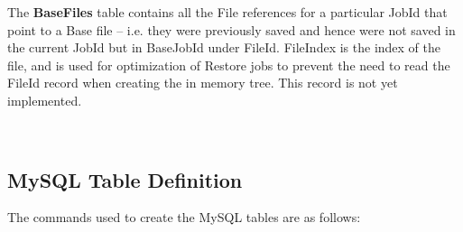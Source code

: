 {{{\begin{longtable}{|l|l|l|}
\end{longtable}

The {\bf BaseFiles} table contains all the File references for a particular
JobId that point to a Base file -- i.e. they were previously saved and hence
were not saved in the current JobId but in BaseJobId under FileId. FileIndex
is the index of the file, and is used for optimization of Restore jobs to
prevent the need to read the FileId record when creating the in memory tree.
This record is not yet implemented. 

\ 

\subsection{MySQL Table Definition}

The commands used to create the MySQL tables are as follows: 

}}}

